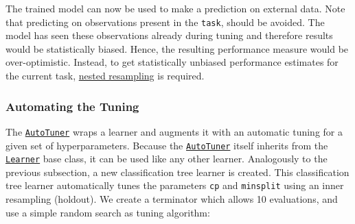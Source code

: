 \documentclass[]{article}
\begin{document}
The trained model can now be used to make a prediction on external data.
Note that predicting on observations present in the \texttt{task}, should be avoided.
The model has seen these observations already during tuning and therefore results would be statistically biased.
Hence, the resulting performance measure would be over-optimistic.
Instead, to get statistically unbiased performance estimates for the current task, \protect\hyperlink{nested-resamling}{nested resampling} is required.

\hypertarget{autotuner}{%
\subsubsection{Automating the Tuning}\label{autotuner}}

The \href{https://mlr3tuning.mlr-org.com/reference/AutoTuner.html}{\texttt{AutoTuner}} wraps a learner and augments it with an automatic tuning for a given set of hyperparameters.
Because the \href{https://mlr3tuning.mlr-org.com/reference/AutoTuner.html}{\texttt{AutoTuner}} itself inherits from the \href{https://mlr3.mlr-org.com/reference/Learner.html}{\texttt{Learner}} base class, it can be used like any other learner.
Analogously to the previous subsection, a new classification tree learner is created.
This classification tree learner automatically tunes the parameters \texttt{cp} and \texttt{minsplit} using an inner resampling (holdout).
We create a terminator which allows 10 evaluations, and use a simple random search as tuning algorithm:
\end{document}
